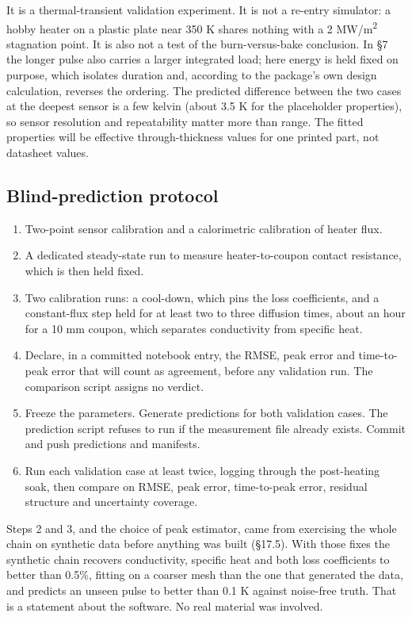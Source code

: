 \documentclass[
  a4paper,
  11pt]{article}
\providecommand{\tightlist}{%
  \setlength{\itemsep}{0pt}\setlength{\parskip}{0pt}}
\begin{document}
It is a thermal-transient validation experiment. It is not a re-entry
simulator: a hobby heater on a plastic plate near 350 K shares nothing
with a 2 MW/m\textsuperscript{2} stagnation point. It is also not a test
of the burn-versus-bake conclusion. In §7 the longer pulse also carries
a larger integrated load; here energy is held fixed on purpose, which
isolates duration and, according to the package's own design
calculation, reverses the ordering. The predicted difference between the
two cases at the deepest sensor is a few kelvin (about 3.5 K for the
placeholder properties), so sensor resolution and repeatability matter
more than range. The fitted properties will be effective
through-thickness values for one printed part, not datasheet values.

\subsection{Blind-prediction protocol}

\begin{enumerate}
\def\labelenumi{\arabic{enumi}.}
\tightlist
\item
  Two-point sensor calibration and a calorimetric calibration of heater
  flux.
\item
  A dedicated steady-state run to measure heater-to-coupon contact
  resistance, which is then held fixed.
\item
  Two calibration runs: a cool-down, which pins the loss coefficients,
  and a constant-flux step held for at least two to three diffusion
  times, about an hour for a 10 mm coupon, which separates conductivity
  from specific heat.
\item
  Declare, in a committed notebook entry, the RMSE, peak error and
  time-to-peak error that will count as agreement, before any validation
  run. The comparison script assigns no verdict.
\item
  Freeze the parameters. Generate predictions for both validation cases.
  The prediction script refuses to run if the measurement file already
  exists. Commit and push predictions and manifests.
\item
  Run each validation case at least twice, logging through the
  post-heating soak, then compare on RMSE, peak error, time-to-peak
  error, residual structure and uncertainty coverage.
\end{enumerate}

Steps 2 and 3, and the choice of peak estimator, came from exercising
the whole chain on synthetic data before anything was built (§17.5).
With those fixes the synthetic chain recovers conductivity, specific
heat and both loss coefficients to better than 0.5\%, fitting on a
coarser mesh than the one that generated the data, and predicts an
unseen pulse to better than 0.1 K against noise-free truth. That is a
statement about the software. No real material was involved.
\end{document}
